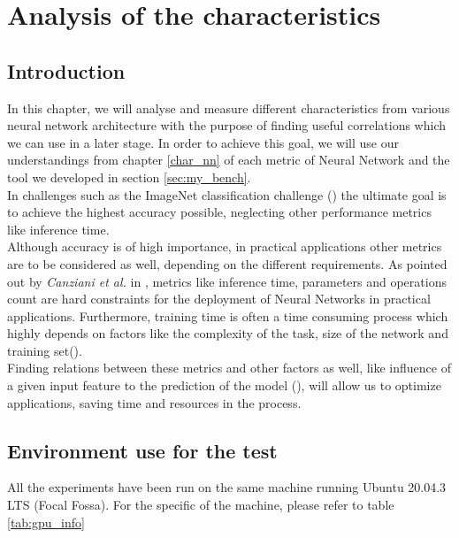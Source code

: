\chapter{Analysis of the characteristics}\label{ana_char}
\section{Introduction}
In this chapter, we will analyse and measure different characteristics from various neural network architecture with the purpose of finding useful correlations which we can use in a later stage. In order to achieve this goal, we will use our understandings from chapter \ref{char_nn} of each metric of Neural Network and the tool we developed in section \ref{sec:my_bench}. \\
In challenges such as the ImageNet classification challenge (\cite{ILSVRC15}) the ultimate goal is to achieve the highest accuracy possible, neglecting other performance metrics like inference time. \cite{DBLP:journals/corr/CanzianiPC16}\\
Although accuracy is of high importance, in practical applications other metrics are to be considered as well, depending on the different requirements. As pointed out by \textit{Canziani et al.} in \cite{DBLP:journals/corr/CanzianiPC16}, metrics like inference time, parameters and operations count are hard constraints
for the deployment of Neural Networks in practical applications. Furthermore, training time is often a time consuming process which highly depends on factors like the complexity of the task, size of the network and training set(\cite{118273}). \\
Finding relations between these metrics and other factors as well, like influence of a given input feature to the prediction of the model (\cite{hooker2019benchmark}), will allow us to optimize applications, saving time and resources in the process.

\section{Environment use for the test}
All the experiments have been run on the same machine running Ubuntu 20.04.3 LTS (Focal Fossa). For the specific of the machine, please refer to table \ref{tab:gpu_info}


